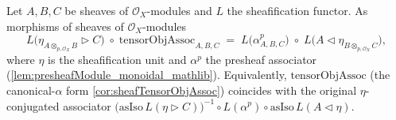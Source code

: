 \begin{lemma}

  \label{lem:tensorObjAssoc_eta_factor_sheaf}
  Let \(A, B, C\) be sheaves of \(\mathcal{O}_X\)-modules and \(L\) the sheafification
  functor. As morphisms of sheaves of \(\mathcal{O}_X\)-modules
  \[
    L\bigl(\eta_{A \otimes_{p,\mathcal{O}_X} B} \rhd C\bigr)
      \;\circ\; \mathrm{tensorObjAssoc}_{A,B,C}
    \;=\;
    L\bigl(\alpha^{p}_{A,B,C}\bigr)
      \;\circ\; L\bigl(A \lhd \eta_{B \otimes_{p,\mathcal{O}_X} C}\bigr),
  \]
  where \(\eta\) is the sheafification unit and \(\alpha^{p}\) the presheaf
  associator (\cref{lem:presheafModule_monoidal_mathlib}). Equivalently,
  \(\mathrm{tensorObjAssoc}\) (the canonical-\(\alpha\) form
  \cref{cor:sheafTensorObjAssoc}) coincides with the original \(\eta\)-conjugated
  associator \(\bigl(\mathrm{asIso}\,L(\eta \rhd C)\bigr)^{-1}
  \circ L(\alpha^{p}) \circ \mathrm{asIso}\,L(A \lhd \eta)\).
\end{lemma}

